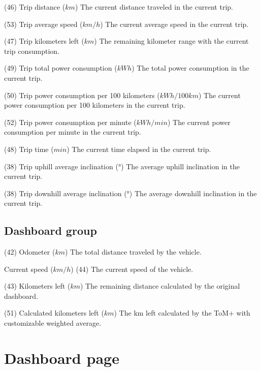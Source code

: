 {(46) Trip distance (\(km\))}
{The current distance traveled in the current trip.}

{(53) Trip average speed (\(km/h\))}
{The current average speed in the current trip.}

{(47) Trip kilometers left (\(km\))}
{The remaining kilometer range with the current trip consumption.}

{(49) Trip total power consumption (\(kWh\))}
{The total power consumption in the current trip.}

{(50) Trip power consumption per 100 kilometers (\(kWh/100km\))}
{The current power consumption per 100 kilometers in the current trip.}

{(52) Trip power consumption per minute (\(kWh/min\))}
{The current power consumption per minute in the current trip.}

{(48) Trip time (\(min\))}
{The current time elapsed in the current trip.}

{(38) Trip uphill average inclination (°)}
{The average uphill inclination in the current trip.}

{(38) Trip downhill average inclination (°)}
{The average downhill inclination in the current trip.}

\subsection{Dashboard group}

{(42) Odometer (\(km\))}
{The total distance traveled by the vehicle.}

{Current speed (\(km/h\))}
{(44) The current speed of the vehicle.}

{(43) Kilometers left (\(km\))}
{The remaining distance calculated by the original dashboard.}

{(51) Calculated kilometers left (\(km\))}
{The km left calculated by the ToM+ with customizable weighted average.}
\label{fig:calculated_kilometers_left}

\clearpage

\section{Dashboard page}

